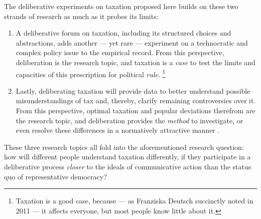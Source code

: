 
The deliberative experiments on taxation proposed here builds on these two strands of research as much as it probes its limits:

\begin{enumerate}
	\item A deliberative forum on taxation, including its structured choices and abstractions, adds another --- yet rare --- experiment on a technocratic and complex policy issue to the empirical record.
	From this perspective, deliberation is the research topic, and taxation is a \emph{case} to test the limits and capacities of this prescription for political \emph{rule}.
	\footnote{
		Taxation is a good case, because --- as Franziska Deutsch succinctly noted in 2011 --- it affects everyone, but most people know little about it.
	}


	\item Lastly, deliberating taxation will provide data to better understand possible misunderstandings of tax and, thereby, clarify remaining controversies over it.
	From this perspective, optimal taxation and popular deviations therefrom are the research topic, and deliberation provides the \emph{method} to investigate, or even resolve these differences in a normatively attractive manner \citep{Rawls-1971,Habermas-1984}.
\end{enumerate}


These three research topics all fold into the aforementioned research question:
how will different people understand taxation differently, if they participate in a deliberative process \emph{closer} to the ideals of communicative action than the status quo of representative democracy?

